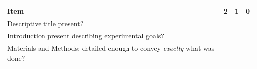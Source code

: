 \documentclass[]{tufte-book}
\begin{document}
\begin{longtable}[]{@{}llll@{}}
\toprule
\begin{minipage}[b]{0.82\columnwidth}\raggedright
Item\strut
\end{minipage} & \begin{minipage}[b]{0.02\columnwidth}\raggedright
2\strut
\end{minipage} & \begin{minipage}[b]{0.02\columnwidth}\raggedright
1\strut
\end{minipage} & \begin{minipage}[b]{0.02\columnwidth}\raggedright
0\strut
\end{minipage}\tabularnewline
\midrule
\endhead
\begin{minipage}[t]{0.82\columnwidth}\raggedright
Descriptive title present?\strut
\end{minipage} & \begin{minipage}[t]{0.02\columnwidth}\raggedright
\strut
\end{minipage} & \begin{minipage}[t]{0.02\columnwidth}\raggedright
\strut
\end{minipage} & \begin{minipage}[t]{0.02\columnwidth}\raggedright
\strut
\end{minipage}\tabularnewline
\begin{minipage}[t]{0.82\columnwidth}\raggedright
Introduction present describing experimental goals?\strut
\end{minipage} & \begin{minipage}[t]{0.02\columnwidth}\raggedright
\strut
\end{minipage} & \begin{minipage}[t]{0.02\columnwidth}\raggedright
\strut
\end{minipage} & \begin{minipage}[t]{0.02\columnwidth}\raggedright
\strut
\end{minipage}\tabularnewline
\begin{minipage}[t]{0.82\columnwidth}\raggedright
Materials and Methods: detailed enough to convey \emph{exactly} what was done?\strut
\end{minipage} & \begin{minipage}[t]{0.02\columnwidth}\raggedright
\strut
\end{minipage} & \begin{minipage}[t]{0.02\columnwidth}\raggedright
\strut
\end{minipage} & \begin{minipage}[t]{0.02\columnwidth}\raggedright

\end{minipage}
\end{longtable}
\end{document}
